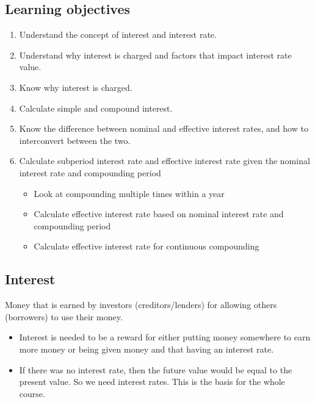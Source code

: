 \subsection{Learning objectives}
\begin{definition}
    \begin{enumerate}
        \item Understand the concept of interest and interest rate. 
        \item Understand why interest is charged and factors that impact interest rate value.
        \item Know why interest is charged. 
        \item Calculate simple and compound interest.
        \item Know the difference between nominal and effective interest rates, and how to interconvert between the two.
        \item Calculate subperiod interest rate and effective interest rate given the nominal interest rate and compounding period
        \begin{itemize}
            \item Look at compounding multiple times within a year
            \item Calculate effective interest rate based on nominal interest rate and compounding period
            \item Calculate effective interest rate for continuous compounding
        \end{itemize}
    \end{enumerate}
\end{definition}

\subsection{Interest}
\begin{definition}
    Money that is earned by investors (creditors/lenders) for allowing others (borrowers) to use their money.
\end{definition}

\begin{intuition}
    \begin{itemize}
        \item Interest is needed to be a reward for either putting money somewhere to earn more money or being given money and that having an interest rate. 
        \item If there was no interest rate, then the future value would be equal to the present value. So we need interest rates. This is the basis for the whole course.
    \end{itemize}
\end{intuition}

